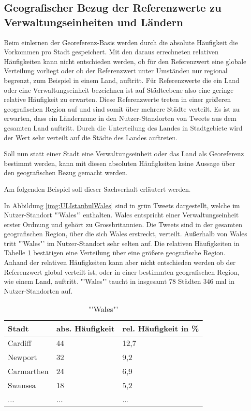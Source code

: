 		\subsection{Geografischer Bezug der Referenzwerte zu Verwaltungseinheiten und Ländern} 

			Beim einlernen der Georeferenz-Basis werden durch die absolute Häufigkeit die Vorkommen pro Stadt gespeichert.
			Mit den daraus errechneten relativen Häufigkeiten kann nicht entschieden werden, ob für den Referenzwert eine globale Verteilung vorliegt oder ob der Referenzwert unter Umständen nur regional begrenzt, zum Beispiel in einem Land, auftritt.
			Für Referenzwerte die ein Land oder eine Verwaltungseinheit bezeichnen ist auf Städteebene also eine geringe relative Häufigkeit zu erwarten.
			Diese Referenzwerte treten in einer größeren geografischen Region auf und sind somit über mehrere Städte verteilt.
			Es ist zu erwarten, dass ein Ländername in den Nutzer-Standorten von Tweets aus dem gesamten Land auftritt.
			Durch die Unterteilung des Landes in Stadtgebiete wird der Wert sehr verteilt auf die Städte des Landes auftreten.

			Soll nun statt einer Stadt eine Verwaltungseinheit oder das Land als Georeferenz bestimmt werden, kann mit diesen absoluten Häufigkeiten keine Aussage über den geografischen Bezug gemacht werden. 
			
			Am folgenden Beispiel soll dieser Sachverhalt erläutert werden.

			In Abbildung \ref{img:ULIstanbulWales} sind in grün Tweets dargestellt, welche im Nutzer-Standort "'Wales"' enthalten.
			Wales entspricht einer Verwaltungseinheit erster Ordnung und gehört zu Grossbritannien.
			Die Tweets sind in der gesamten geografischen Region, über die sich Wales erstreckt, verteilt.
			Außerhalb von Wales tritt "'Wales"' im Nutzer-Standort sehr selten auf.
			Die relativen Häufigkeiten in Tabelle \ref{tab:walesCity} bestätigen eine Verteilung über eine größere geografische Region.
			Anhand der relativen Häufigkeiten kann aber nicht entschieden werden ob der Referenzwert global verteilt ist, oder in einer bestimmten geografischen Region, wie einem Land, auftritt. 
			"'Wales"' taucht in insgesamt 78 Städten 346 mal in Nutzer-Standorten auf.

			\begin{table}[h]
			\centering
			\caption{"'Wales"'}
			\label{tab:walesCity}
			\begin{tabular}{|l|l|l|}
			\hline
			Stadt      & abs. Häufigkeit & rel. Häufigkeit in \% \\ \hline \hline
			Cardiff    & 44 			 & 12,7 \\ \hline
			Newport    & 32 			 & 9,2  \\ \hline
			Carmarthen & 24 			 & 6,9  \\ \hline
			Swansea    & 18 			 & 5,2  \\ \hline
			...    & ... & ...  \\ \hline
			\end{tabular}
			\end{table}

